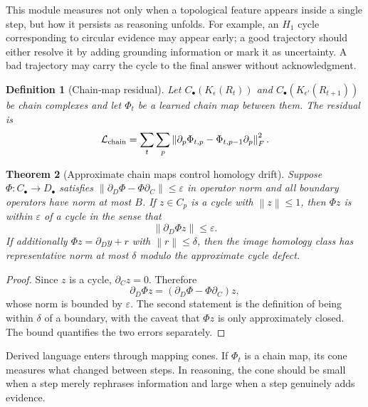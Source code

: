 \documentclass[11pt]{article}
\newtheorem{definition}{Definition}[section]
\newtheorem{theorem}[definition]{Theorem}
\newcommand{\calL}{\mathcal{L}}
\newcommand{\norm}[1]{\left\lVert #1\right\rVert}
\newcommand{\eps}{\varepsilon}
\begin{document}
This module measures not only when a topological feature appears inside a single step, but how it persists as reasoning unfolds.  For example, an \(H_1\) cycle corresponding to circular evidence may appear early; a good trajectory should either resolve it by adding grounding information or mark it as uncertainty.  A bad trajectory may carry the cycle to the final answer without acknowledgment.

\begin{definition}[Chain-map residual]
Let \(C_\bullet(K_\epsilon(R_t))\) and \(C_\bullet(K_{\epsilon'}(R_{t+1}))\) be chain complexes and let \(\Phi_t\) be a learned chain map between them.  The residual is
\begin{equation}
\calL_{\rm chain}=\sum_t\sum_p\norm{\partial_{p}\Phi_{t,p}-\Phi_{t,p-1}\partial_p}_F^2.
\end{equation}
\end{definition}

\begin{theorem}[Approximate chain maps control homology drift]
Suppose \(\Phi:C_\bullet\to D_\bullet\) satisfies \(\norm{\partial_D\Phi-\Phi\partial_C}\le\eps\) in operator norm and all boundary operators have norm at most \(B\).  If \(z\in C_p\) is a cycle with \(\norm{z}\le1\), then \(\Phi z\) is within \(\eps\) of a cycle in the sense that
\begin{equation}
\norm{\partial_D\Phi z}\le \eps.
\end{equation}
If additionally \(\Phi z=\partial_D y+r\) with \(\norm{r}\le\delta\), then the image homology class has representative norm at most \(\delta\) modulo the approximate cycle defect.
\end{theorem}

\begin{proof}
Since \(z\) is a cycle, \(\partial_Cz=0\).  Therefore
\begin{equation}
\partial_D\Phi z=(\partial_D\Phi-\Phi\partial_C)z,
\end{equation}
whose norm is bounded by \(\eps\).  The second statement is the definition of being within \(\delta\) of a boundary, with the caveat that \(\Phi z\) is only approximately closed.  The bound quantifies the two errors separately.
\end{proof}

Derived language enters through mapping cones.  If \(\Phi_t\) is a chain map, its cone measures what changed between steps.  In reasoning, the cone should be small when a step merely rephrases information and large when a step genuinely adds evidence.
\end{document}
